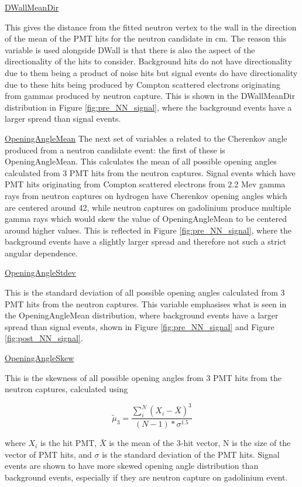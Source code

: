 \underline{DWallMeanDir}

This gives the distance from the fitted neutron vertex to the wall in the direction of the mean of the PMT hits for the neutron candidate in cm. The reason this variable is used alongside DWall is that there is also the aspect of the directionality of the hits to consider. Background hits do not have directionality due to them being a product of noise hits but signal events do have directionality due to these hits being produced by Compton scattered electrons originating from gammas produced by neutron capture. This is shown in the DWallMeanDir distribution in Figure \ref{fig:pre_NN_signal}, where the background events have a larger spread than signal events.

\underline{OpeningAngleMean}
The next set of variables a related to the Cherenkov angle produced from a neutron candidate event: the first of these is OpeningAngleMean.
This calculates the mean of all possible opening angles calculated from 3 PMT hits from the neutron captures. Signal events which have PMT hits originating from Compton scattered electrons from 2.2 Mev gamma rays from neutron captures on hydrogen have Cherenkov opening angles which are centered around 42\degree, while neutron captures on gadolinium produce multiple gamma rays which would skew the value of OpeningAngleMean to be centered around higher values. This is reflected in Figure \ref{fig:pre_NN_signal}, where the background events have a slightly larger spread and therefore not such a strict angular dependence.

\underline{OpeningAngleStdev}

This is the standard deviation of all possible opening angles calculated from 3 PMT hits from the neutron captures. This variable emphasises what is seen in the OpeningAngleMean distribution, where background events have a larger spread than signal events, shown in Figure \ref{fig:pre_NN_signal} and Figure \ref{fig:post_NN_signal}. 

\underline{OpeningAngleSkew}

This is the skewness of all possible opening angles from 3 PMT hits from the neutron captures, calculated using

\begin{equation}
    \tilde{\mu}_3=\frac{\sum_i^N\left(X_i-\bar{X}\right)^3}{(N-1) * \sigma^{1.5}}
\end{equation}

where $X_{i}$ is the hit PMT, $\bar{X}$ is the mean of the 3-hit vector, N is the size of the vector of PMT hits, and $\sigma$ is the standard deviation of the PMT hits. Signal events are shown to have more skewed opening angle distribution than background events, especially if they are neutron capture on gadolinium event.

